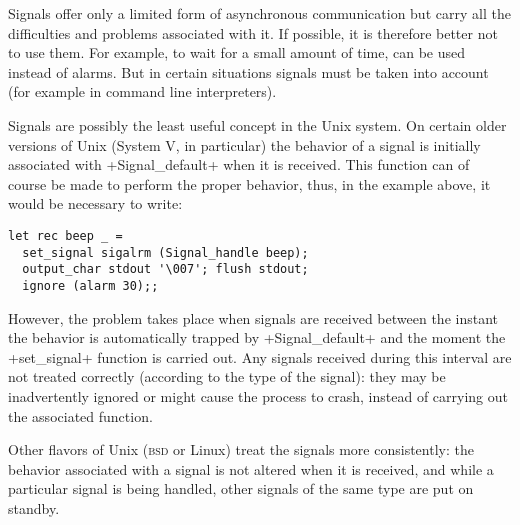 Signals offer only a limited form of asynchronous communication but
carry all the difficulties and problems associated with it. If possible,
it is therefore better not to use them. For example, to wait for a small
amount of time,  can be used instead of alarms. But
in certain situations signals must be taken into account (for example in
command line interpreters).

Signals are possibly the least useful concept in the Unix system.  On
certain older versions of Unix (System V, in particular) the behavior
of a signal is initially associated with
\ml+Signal_default+ when it is received.  This function can of course
be made to perform the proper behavior, thus, in the 
example above, it would be necessary to write:

\begin{lstlisting}
let rec beep _ =
  set_signal sigalrm (Signal_handle beep);
  output_char stdout '\007'; flush stdout;
  ignore (alarm 30);;
\end{lstlisting}

However, the problem takes place when signals are received between the
instant the behavior is automatically trapped by \ml+Signal_default+
and the moment the \ml+set_signal+ function is carried out.  
Any signals received during this interval are not treated correctly 
(according to the type of the signal): they may be inadvertently 
ignored or might cause the process to crash, instead of carrying 
out the associated function.

Other flavors of Unix (\textsc{bsd} or Linux) treat the 
signals more consistently: the behavior associated with a 
signal is not altered when it is received, and while a particular 
signal is being handled, other signals of the same type are put on standby.

